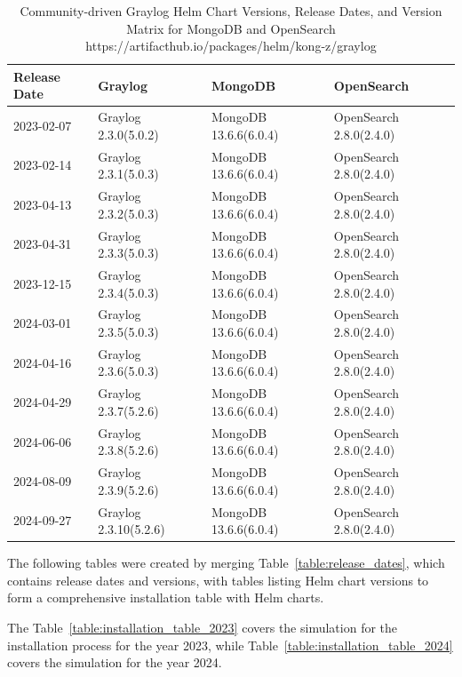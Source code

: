 \documentclass[../main.tex]{subfiles}
\begin{document}
\begin{table}[h]
\centering
\begin{tabular}{|l|l|l|l|}
\hline
\textbf{Release Date} & \textbf{Graylog}  & \textbf{MongoDB} & \textbf{OpenSearch} \\ \hline
    2023-02-07 & Graylog 2.3.0(5.0.2) & MongoDB 13.6.6(6.0.4) & OpenSearch 2.8.0(2.4.0) \\ \hline
    2023-02-14 & Graylog 2.3.1(5.0.3) & MongoDB 13.6.6(6.0.4) & OpenSearch 2.8.0(2.4.0) \\ \hline
    2023-04-13 & Graylog 2.3.2(5.0.3) & MongoDB 13.6.6(6.0.4) & OpenSearch 2.8.0(2.4.0) \\ \hline
    2023-04-31 & Graylog 2.3.3(5.0.3) & MongoDB 13.6.6(6.0.4) & OpenSearch 2.8.0(2.4.0) \\ \hline
    2023-12-15 & Graylog 2.3.4(5.0.3) & MongoDB 13.6.6(6.0.4) & OpenSearch 2.8.0(2.4.0) \\ \hline
    2024-03-01 & Graylog 2.3.5(5.0.3) & MongoDB 13.6.6(6.0.4) & OpenSearch 2.8.0(2.4.0) \\ \hline
    2024-04-16 & Graylog 2.3.6(5.0.3) & MongoDB 13.6.6(6.0.4) & OpenSearch 2.8.0(2.4.0) \\ \hline
    2024-04-29 & Graylog 2.3.7(5.2.6) & MongoDB 13.6.6(6.0.4) & OpenSearch 2.8.0(2.4.0) \\ \hline
    2024-06-06 & Graylog 2.3.8(5.2.6) & MongoDB 13.6.6(6.0.4) & OpenSearch 2.8.0(2.4.0) \\ \hline
    2024-08-09 & Graylog 2.3.9(5.2.6) & MongoDB 13.6.6(6.0.4) & OpenSearch 2.8.0(2.4.0) \\ \hline
    2024-09-27 & Graylog 2.3.10(5.2.6) & MongoDB 13.6.6(6.0.4) & OpenSearch 2.8.0(2.4.0) \\ \hline
\end{tabular}
\caption{Community-driven Graylog Helm Chart Versions, Release Dates, and Version Matrix for MongoDB and OpenSearch https://artifacthub.io/packages/helm/kong-z/graylog}
\label{table:graylog_helm_versions}
\end{table}

The following tables were created by merging Table~\ref{table:release_dates}, which contains release dates and versions, with tables listing Helm chart versions to form a comprehensive installation table with Helm charts.

The Table~\ref{table:installation_table_2023} covers the simulation for the installation process for the year 2023, while Table~\ref{table:installation_table_2024} covers the simulation for the year 2024.
\end{document}
